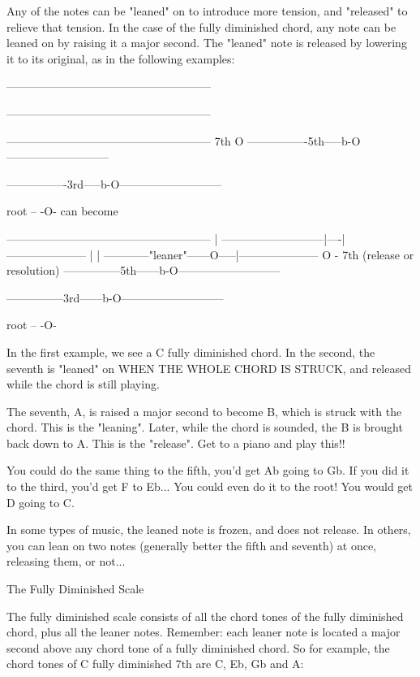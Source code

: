 Any of the notes can be "leaned" on to introduce more tension, and "released"
to relieve that tension. In the case of the fully diminished chord, any note
can be leaned on by raising it a major second. The "leaned" note is released
by lowering it to its original, as in the following examples:


------------------------------------------------------

------------------------------------------------------

------------------------------------------------------
                   7th      O
----------------5th-----b-O---------------------------

----------------3rd-----b-O---------------------------

               root  --  -O-
can become


------------------------------------------------------
                           |
---------------------------|----|---------------------
                           |    |
------------"leaner"------O-----|---------------------
                               O  - 7th (release or resolution)
---------------5th------b-O---------------------------

---------------3rd------b-O---------------------------

              root  --   -O-


In the first example, we see a C fully diminished chord. In the second, the
seventh is "leaned" on WHEN THE WHOLE CHORD IS STRUCK, and released while the
chord is still playing.

The seventh, A, is raised a major second to become B, which is struck with the
chord. This is the "leaning". Later, while the chord is sounded, the B is
brought back down to A. This is the "release". Get to a piano and play this!!

You could do the same thing to the fifth, you'd get Ab going to Gb. If you did
it to the third, you'd get F to Eb... You could even do it to the root! You
would get D going to C.

In some types of music, the leaned note is frozen, and does not release. In
others, you can lean on two notes (generally better the fifth and seventh) at
once, releasing them, or not...

The Fully Diminished Scale

The fully diminished scale consists of all the chord tones of the fully
diminished chord, plus all the leaner notes. Remember: each leaner note is
located a major second above any chord tone of a fully diminished chord.
So for example, the chord tones of C fully diminished 7th are C, Eb, Gb and A:

